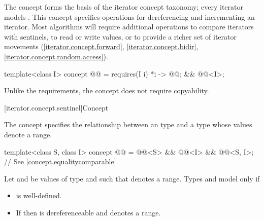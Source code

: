 \pnum
The  concept forms the basis
of the iterator concept taxonomy; every iterator models .
This concept specifies operations for dereferencing and incrementing
an iterator. Most algorithms will require additional operations
to compare iterators with sentinels, to
read or write values, or
to provide a richer set of iterator movements (\ref{iterator.concept.forward},
\ref{iterator.concept.bidir}, \ref{iterator.concept.random.access}).

\begin{codeblock}
template<class I>
  concept @@ =
    requires(I i) {
      { *i } -> @@;
    } &&
    @@<I>;
\end{codeblock}

\pnum
\begin{note}
Unlike the  requirements,
the  concept does not require copyability.
\end{note}

[iterator.concept.sentinel]{Concept }

\pnum
The  concept specifies the relationship
between an  type and a  type
whose values denote a range.

\begin{itemdecl}
template<class S, class I>
  concept @@ =
    @@<S> &&
    @@<I> &&
    @@<S, I>; // See \ref{concept.equalitycomparable}
\end{itemdecl}

\begin{itemdescr}
\pnum
Let  and  be values of type  and
 such that  denotes a range. Types
 and  model  only if
\begin{itemize}
\item {} is well-defined.

\item If  then  is dereferenceable and
       denotes a range.
\end{itemize}
\end{itemdescr}

